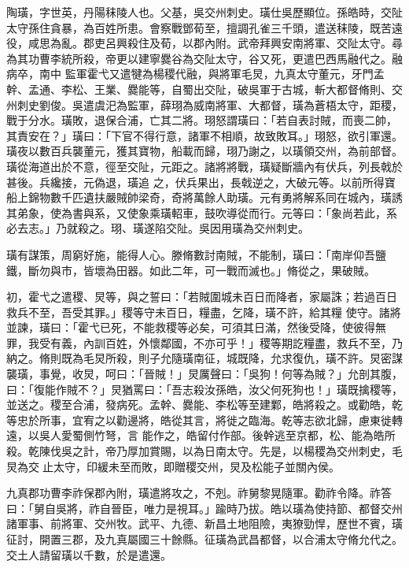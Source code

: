 \begin{pinyinscope}
 陶璜，字世英，丹陽秣陵人也。父基，吳交州刺史。璜仕吳歷顯位。孫皓時，交阯太守孫住貪暴，為百姓所患。會察戰鄧荀至，擅調孔雀三千頭，遣送秣陵，既苦遠役，咸思為亂。郡吏呂興殺住及荀，以郡內附。武帝拜興安南將軍、交阯太守。尋為其功曹李統所殺，帝更以建寧爨谷為交阯太守，谷又死，更遣巴西馬融代之。融病卒，南中
 監軍霍弋又遣犍為楊稷代融，與將軍毛炅，九真太守董元，牙門孟幹、孟通、李松、王業、爨能等，自蜀出交阯，破吳軍于古城，斬大都督脩則、交州刺史劉俊。吳遣虞汜為監軍，薛珝為威南將軍、大都督，璜為蒼梧太守，距稷，戰于分水。璜敗，退保合浦，亡其二將。珝怒謂璜曰：「若自表討賊，而喪二帥，其責安在？」璜曰：「下官不得行意，諸軍不相順，故致敗耳。」珝怒，欲引軍還。璜夜以數百兵襲董元，獲其寶物，船載而歸，珝乃謝之，以璜領交州，為前部督。璜從海道出於不意，徑至交阯，元距之。諸將將戰，璜疑斷牆內有伏兵，列長戟於甚後。兵纔接，元偽退，璜追
 之，伏兵果出，長戟逆之，大破元等。以前所得寶船上錦物數千匹遺扶嚴賊帥梁奇，奇將萬餘人助璜。元有勇將解系同在城內，璜誘其弟象，使為書與系，又使象乘璜軺車，鼓吹導從而行。元等曰：「象尚若此，系必去志。」乃就殺之。珝、璜遂陷交阯。吳因用璜為交州刺史。



 璜有謀策，周窮好施，能得人心。滕脩數討南賊，不能制，璜曰：「南岸仰吾鹽鐵，斷勿與市，皆壞為田器。如此二年，可一戰而滅也。」脩從之，果破賊。



 初，霍弋之遣稷、炅等，與之誓曰：「若賊圍城未百日而降者，家屬誅；若過百日救兵不至，吾受其罪。」稷等守未百日，糧盡，乞降，璜不許，給其糧
 使守。諸將並諫，璜曰：「霍弋已死，不能救稷等必矣，可須其日滿，然後受降，使彼得無罪，我受有義，內訓百姓，外懷鄰國，不亦可乎！」稷等期訖糧盡，救兵不至，乃納之。脩則既為毛炅所殺，則子允隨璜南征，城既降，允求復仇，璜不許。炅密謀襲璜，事覺，收炅，呵曰：「晉賊！」炅厲聲曰：「吳狗！何等為賊？」允剖其腹，曰：「復能作賊不？」炅猶罵曰：「吾志殺汝孫皓，汝父何死狗也！」璜既擒稷等，並送之。稷至合浦，發病死。孟幹、爨能、李松等至建鄴，皓將殺之。或勸皓，乾等忠於所事，宜宥之以勸邊將，皓從其言，將徙之臨海。乾等志欲北歸，慮東徙轉遠，以吳人愛蜀側竹弩，言
 能作之，皓留付作部。後幹逃至京都，松、能為皓所殺。乾陳伐吳之計，帝乃厚加賞賜，以為日南太守。先是，以楊稷為交州刺史，毛炅為交止太守，印緩未至而敗，即贈稷交州，炅及松能子並關內侯。



 九真郡功曹李祚保郡內附，璜遣將攻之，不剋。祚舅黎晃隨軍。勸祚令降。祚答曰：「舅自吳將，祚自晉臣，唯力是視耳。」踰時乃拔。皓以璜為使持節、都督交州諸軍事、前將軍、交州牧。武平、九德、新昌土地阻險，夷獠勁悍，歷世不賓，璜征討，開置三郡，及九真屬國三十餘縣。征璜為武昌都督，以合浦太守脩允代之。交土人請留璜以千數，於是遣還。




\end{pinyinscope}

